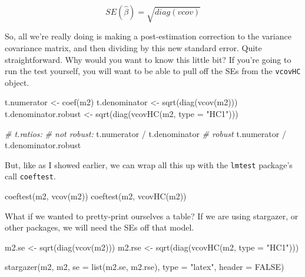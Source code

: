 \documentclass[
]{article}
\newenvironment{Shaded}{\begin{snugshade}}{\end{snugshade}}
\newcommand{\AttributeTok}[1]{\textcolor[rgb]{0.77,0.63,0.00}{#1}}
\newcommand{\CommentTok}[1]{\textcolor[rgb]{0.56,0.35,0.01}{\textit{#1}}}
\newcommand{\ConstantTok}[1]{\textcolor[rgb]{0.00,0.00,0.00}{#1}}
\newcommand{\FunctionTok}[1]{\textcolor[rgb]{0.00,0.00,0.00}{#1}}
\newcommand{\NormalTok}[1]{#1}
\newcommand{\OtherTok}[1]{\textcolor[rgb]{0.56,0.35,0.01}{#1}}
\newcommand{\SpecialCharTok}[1]{\textcolor[rgb]{0.00,0.00,0.00}{#1}}
\newcommand{\StringTok}[1]{\textcolor[rgb]{0.31,0.60,0.02}{#1}}
\begin{document}
\[
  SE(\hat{\beta}) = \sqrt{diag(vcov)}
\]

So, all we're really doing is making a post-estimation correction to the variance covariance matrix, and then dividing by this new standard error. Quite straightforward. Why would you want to know this little bit? If you're going to run the test yourself, you will want to be able to pull off the SEs from the \texttt{vcovHC} object.

\begin{Shaded}
\begin{Highlighting}[]
\NormalTok{t.numerator   }\OtherTok{\textless{}{-}} \FunctionTok{coef}\NormalTok{(m2)}
\NormalTok{t.denominator }\OtherTok{\textless{}{-}} \FunctionTok{sqrt}\NormalTok{(}\FunctionTok{diag}\NormalTok{(}\FunctionTok{vcov}\NormalTok{(m2)))}
\NormalTok{t.denominator.robust }\OtherTok{\textless{}{-}} \FunctionTok{sqrt}\NormalTok{(}\FunctionTok{diag}\NormalTok{(}\FunctionTok{vcovHC}\NormalTok{(m2, }\AttributeTok{type =} \StringTok{"HC1"}\NormalTok{)))}

\CommentTok{\# t.ratios: }
\CommentTok{\# not robust: }
\NormalTok{t.numerator }\SpecialCharTok{/}\NormalTok{ t.denominator}
\CommentTok{\# robust }
\NormalTok{t.numerator }\SpecialCharTok{/}\NormalTok{ t.denominator.robust}
\end{Highlighting}
\end{Shaded}

But, like as I showed earlier, we can wrap all this up with the \texttt{lmtest} package's call \texttt{coeftest}.

\begin{Shaded}
\begin{Highlighting}[]
\FunctionTok{coeftest}\NormalTok{(m2, }\FunctionTok{vcov}\NormalTok{(m2))}
\FunctionTok{coeftest}\NormalTok{(m2, }\FunctionTok{vcovHC}\NormalTok{(m2))}
\end{Highlighting}
\end{Shaded}

What if we wanted to pretty-print ourselves a table? If we are using stargazer, or other packages, we will need the SEs off that model.

\begin{Shaded}
\begin{Highlighting}[]
\NormalTok{m2.se  }\OtherTok{\textless{}{-}} \FunctionTok{sqrt}\NormalTok{(}\FunctionTok{diag}\NormalTok{(}\FunctionTok{vcov}\NormalTok{(m2)))}
\NormalTok{m2.rse }\OtherTok{\textless{}{-}} \FunctionTok{sqrt}\NormalTok{(}\FunctionTok{diag}\NormalTok{(}\FunctionTok{vcovHC}\NormalTok{(m2, }\AttributeTok{type =} \StringTok{"HC1"}\NormalTok{)))}

\FunctionTok{stargazer}\NormalTok{(m2, m2, }\AttributeTok{se =} \FunctionTok{list}\NormalTok{(m2.se, m2.rse), }
          \AttributeTok{type =} \StringTok{"latex"}\NormalTok{, }\AttributeTok{header =} \ConstantTok{FALSE}\NormalTok{)}
\end{Highlighting}
\end{Shaded}
\end{document}
